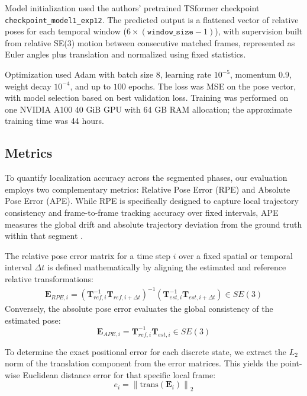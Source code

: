 \documentclass[pdflatex,sn-mathphys-num]{sn-jnl}
\theoremstyle{thmstyleone}%
\theoremstyle{thmstyletwo}%
\theoremstyle{thmstylethree}%
\begin{document}
Model initialization used the authors' pretrained TSformer checkpoint \texttt{checkpoint\_model1\_exp12}. The predicted output is a flattened vector of relative poses for each temporal window ($6\times(\texttt{window\_size}-1)$), with supervision built from relative SE(3) motion between consecutive matched frames, represented as Euler angles plus translation and normalized using fixed statistics.

Optimization used Adam with batch size $8$, learning rate $10^{-5}$, momentum $0.9$, weight decay $10^{-4}$, and up to $100$ epochs. The loss was MSE on the pose vector, with model selection based on best validation loss. Training was performed on one NVIDIA A100 40 GiB GPU with 64 GB RAM allocation; the approximate training time was 44 hours.

\subsection{Metrics}
To quantify localization accuracy across the segmented phases, our evaluation employs two complementary metrics: Relative Pose Error (RPE) and Absolute Pose Error (APE). While RPE is specifically designed to capture local trajectory consistency and frame-to-frame tracking accuracy over fixed intervals, APE measures the global drift and absolute trajectory deviation from the ground truth within that segment \cite{grupp2017evo}. 

The relative pose error matrix for a time step $i$ over a fixed spatial or temporal interval $\Delta t$ is defined mathematically by aligning the estimated and reference relative transformations:
\begin{equation}
  \begin{gathered}
    \mathbf{E}_{RPE,i} = \left( \mathbf{T}_{ref,i}^{-1} \mathbf{T}_{ref,i+\Delta t} \right)^{-1} 
    \left( \mathbf{T}_{est,i}^{-1} \mathbf{T}_{est,i+\Delta t} \right) \in SE(3)
\end{gathered}
\end{equation}
Conversely, the absolute pose error evaluates the global consistency of the estimated pose:
\begin{equation}
    \mathbf{E}_{APE,i} = \mathbf{T}_{ref,i}^{-1} \mathbf{T}_{est,i} \in SE(3)
\end{equation}

To determine the exact positional error for each discrete state, we extract the $L_2$ norm of the translation component from the error matrices. This yields the point-wise Euclidean distance error for that specific local frame:
\begin{equation}
    e_i = \left\| \text{trans}(\mathbf{E}_i) \right\|_2
\end{equation}
\end{document}
